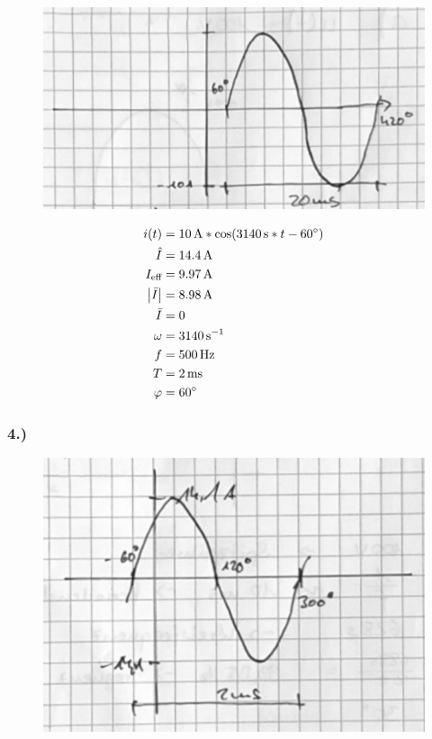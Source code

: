 \documentclass[../../document.tex]{subfiles}
\begin{document}
\begin{figure}[H]
    \begin{center}
        \includegraphics[width=.9\linewidth]{../../img/aufg1-a-3}
    \end{center}
\end{figure}

\begin{equation*}
    \begin{split}
        i(t) &= \SI{10}{\ampere} * \cos(\SI{3140}{\second} * t - \SI{60}{\degree})\\
        \hat{I} &= \SI{14,4}{\ampere}\\
        I_{\textrm{eff}} &= \SI{9,97}{\ampere}\\
        \left\lvert\bar{I}\right\rvert &= \SI{8,98}{\ampere}\\
        \bar{I} &= 0\\
        \omega &= \SI{3140}{\second^{-1}}\\
        f &= \SI{500}{\hertz}\\
        T &= \SI{2}{ms}\\
        \varphi &= \SI{60}{\degree}\\
    \end{split}
\end{equation*}

\newpage

\subsubsection*{4.)}

\begin{figure}[H]
    \begin{center}
        \includegraphics[width=.9\linewidth]{../../img/aufg1-a-4}
    \end{center}
\end{figure}
\end{document}
